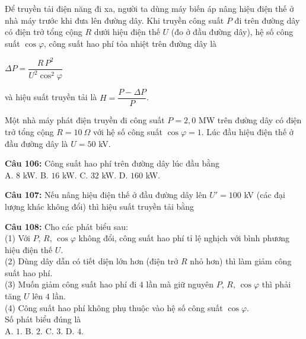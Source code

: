 \documentclass[12pt,a4paper]{article}
\begin{document}
\par\nobreak

Để truyền tải điện năng đi xa, người ta dùng máy biến áp nâng hiệu điện thế ở nhà máy trước khi đưa lên đường dây. Khi truyền công suất $P$ đi trên đường dây có điện trở tổng cộng $R$ dưới hiệu điện thế $U$ (đo ở đầu đường dây), hệ số công suất $\cos\varphi$, công suất hao phí tỏa nhiệt trên đường dây là
\begin{center}$\Delta P=\dfrac{R\,P^2}{U^2\cos^2\varphi}$\end{center}
và hiệu suất truyền tải là $H=\dfrac{P-\Delta P}{P}$.

Một nhà máy phát điện truyền đi công suất $P=2{,}0$ MW trên đường dây có điện trở tổng cộng $R=10\ \Omega$ với hệ số công suất $\cos\varphi=1$. Lúc đầu hiệu điện thế ở đầu đường dây là $U=50$ kV.

\par\nobreak


\noindent \textbf{Câu 106:} Công suất hao phí trên đường dây lúc đầu bằng\\
\noindent A. $8$ kW. \hfill B. $16$ kW. \hfill C. $32$ kW. \hfill D. $160$ kW.



\vspace{0.3cm}

\noindent \textbf{Câu 107:} Nếu nâng hiệu điện thế ở đầu đường dây lên $U'=100$ kV (các đại lượng khác không đổi) thì hiệu suất truyền tải bằng\\
\noindent{}



\vspace{0.3cm}

\noindent \textbf{Câu 108:} Cho các phát biểu sau:\\
(1) Với $P$, $R$, $\cos\varphi$ không đổi, công suất hao phí tỉ lệ nghịch với bình phương hiệu điện thế $U$.\\
(2) Dùng dây dẫn có tiết diện lớn hơn (điện trở $R$ nhỏ hơn) thì làm giảm công suất hao phí.\\
(3) Muốn giảm công suất hao phí đi $4$ lần mà giữ nguyên $P$, $R$, $\cos\varphi$ thì phải tăng $U$ lên $4$ lần.\\
(4) Công suất hao phí không phụ thuộc vào hệ số công suất $\cos\varphi$.\\
Số phát biểu đúng là\\
\noindent A. $1$. \hfill B. $2$. \hfill C. $3$. \hfill D. $4$.
\end{document}
